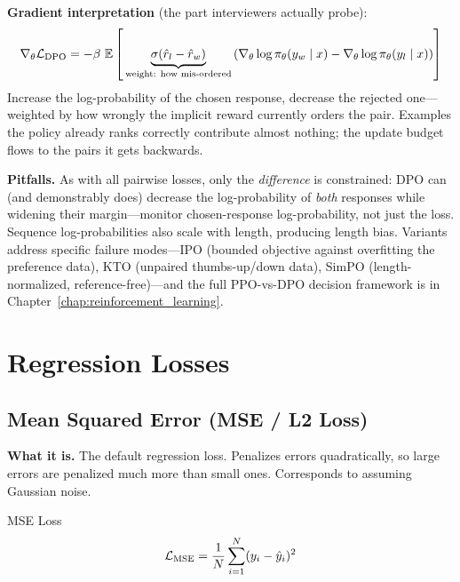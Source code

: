 \textbf{Gradient interpretation} (the part interviewers actually probe):
\begin{equation}
\nabla_\theta \mathcal{L}_{\text{DPO}} = -\beta \, \operatorname{\mathbb{E}}\left[\, \underbrace{\sigma\!\left(\hat{r}_l - \hat{r}_w\right)}_{\text{weight: how mis-ordered}} \left( \nabla_\theta \log \pi_\theta(y_w \mid x) - \nabla_\theta \log \pi_\theta(y_l \mid x) \right) \right]
\end{equation}
Increase the log-probability of the chosen response, decrease the rejected one---weighted by how wrongly the implicit reward currently orders the pair. Examples the policy already ranks correctly contribute almost nothing; the update budget flows to the pairs it gets backwards.

\textbf{Pitfalls.} As with all pairwise losses, only the \textit{difference} is constrained: DPO can (and demonstrably does) decrease the log-probability of \textit{both} responses while widening their margin---monitor chosen-response log-probability, not just the loss. Sequence log-probabilities also scale with length, producing length bias. Variants address specific failure modes---IPO (bounded objective against overfitting the preference data), KTO (unpaired thumbs-up/down data), SimPO (length-normalized, reference-free)---and the full PPO-vs-DPO decision framework is in Chapter~\ref{chap:reinforcement_learning}.

\section{Regression Losses}
\label{sec:regression_losses}

\subsection{Mean Squared Error (MSE / L2 Loss)}

\textbf{What it is.} The default regression loss. Penalizes errors quadratically, so large errors are penalized much more than small ones. Corresponds to assuming Gaussian noise.

\begin{mathresult}{MSE Loss}
\begin{equation}
\mathcal{L}_{\text{MSE}} = \frac{1}{N}\sum_{i=1}^{N}(y_i - \hat{y}_i)^2
\end{equation}
\end{mathresult}

